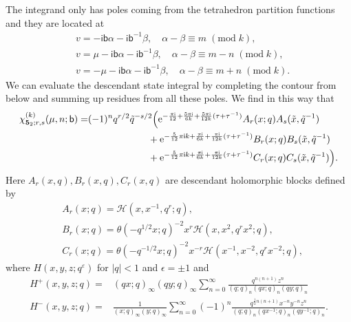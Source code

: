 \documentclass[a4paper,11pt]{article}	%
\def\mc{\mathcal}
\def\md{\mathbf}
\def\ms{\mathsf}
\def\tq{\tilde{q}}
\def\tx{\tilde{x}}
\newcommand{\re}{{\rm e}}
\newcommand{\ri}{{\mathsf{i}}}
\newcommand{\nn}{\nonumber \\}
\newcommand{\bb}{\ms{b}}
\newcommand{\knot}[1]{\md{#1}}
\begin{document}
The integrand only has poles coming from the tetrahedron partition
functions and they are located at
\begin{align}
  &v =
    -\ri\bb\alpha-\ri\bb^{-1}\beta,\quad
    \alpha-\beta \equiv m \;(\text{mod}\; k), \\
  &v = \mu-\ri\bb\alpha-\ri\bb^{-1}\beta,\quad
    \alpha-\beta \equiv m-n \;(\text{mod}\; k),\\
  &v = -\mu -\ri\bb\alpha - \ri\bb^{-1}\beta,\quad
    \alpha-\beta \equiv m+n \;(\text{mod}\; k).
\end{align}
We can evaluate the descendant state integral by completing the
contour from below and summing up residues from all these poles.  We
find in this way that
\begin{align}
  \chi^{(k)}_{\knot{5}_2;r,s}(\mu,n;\bb) = 
    &(-1)^n q^{r/2}\tq^{-s/2}
      \Big(
      \re^{-\frac{\pi\ri}{12}+\frac{5\pi\ri}{6k}+\frac{5\pi\ri}{12k}(\tau+\tau^{-1})}
      A_r(x;q)A_{s}(\tx,\tq^{-1})\nn
    &\phantom{========}
      +\re^{-\frac{5}{12}\pi\ri k+\frac{\pi\ri}{6k}+\frac{\pi\ri}{12k}(\tau+\tau^{-1})}
      B_r(x;q)B_{s}(\tx,\tq^{-1})\nn
    &\phantom{========}
      +\re^{-\frac{5}{12}\pi\ri k+\frac{\pi\ri}{6k} +\frac{\pi\ri}{12k}(\tau+\tau^{-1})}
      C_r(x;q)C_{s}(\tx,\tq^{-1})
      \Big).      
\end{align}
Here $A_r(x,q), B_r(x,q), C_r(x,q)$ are descendant holomorphic blocks
defined by
\begin{subequations}
  \begin{align}
    &A_r(x;q) = \mc{H}(x,x^{-1},q^r;q),\\
    &B_r(x;q) = \theta(-q^{1/2}x;q)^{-2} x^r
      \mc{H}(x,x^2,q^rx^2;q),\\
    &C_r(x;q) = \theta(-q^{-1/2}x;q)^{-2}x^{-r}
      \mc{H}(x^{-1},x^{-2},q^rx^{-2};q),
  \end{align}
\end{subequations}
where $H(x,y,z;q^\varepsilon)$ for $|q|<1$ and $\epsilon = \pm 1$ and
\begin{subequations}
  \begin{align}
    H^+(x,y,z;q) =
    &(qx;q)_\infty (qy;q)_\infty
    \sum_{n=0}^\infty \frac{q^{n(n+1)}z^n}{(q;q)_n(qx;q)_n(qy;q)_n}\\
    H^-(x,y,z;q) =
    &\frac{1}{(x;q)_\infty(y;q)_\infty}
      \sum_{n=0}^\infty (-1)^n
      \frac{q^{\frac{1}{2}n(n+1)}x^{-n}y^{-n}z^n}
      {(q;q)_n(qx^{-1};q)_n(qy^{-1};q)_n}.
  \end{align}
\end{subequations}
\end{document}
